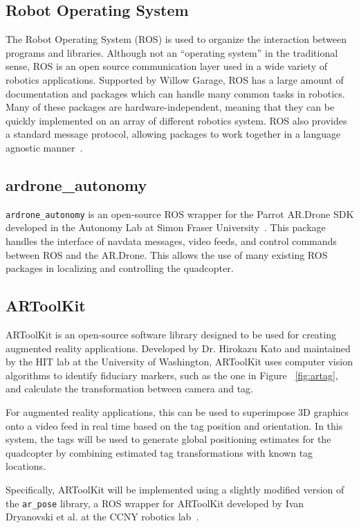     \subsection{Robot Operating System}
         The Robot Operating System (ROS) is used to organize the interaction between programs and libraries. Although not an ``operating system'' in the traditional sense, ROS is an open source communication layer used in a wide variety of robotics applications. Supported by Willow Garage, ROS has a large amount of documentation and packages which can handle many common tasks in robotics. Many of these packages are hardware-independent, meaning that they can be quickly implemented on an array of different robotics system. ROS also provides a standard message protocol, allowing packages to work together in a language agnostic manner~\cite{ROS}.

    \subsection{ardrone\_autonomy}
        \texttt{ardrone\_autonomy} is an open-source ROS wrapper for the Parrot AR.Drone SDK developed in the Autonomy Lab at Simon Fraser University~\cite{Autonomy}. This package handles the interface of navdata messages, video feeds, and control commands between ROS and the AR.Drone. This allows the use of many existing ROS packages in localizing and controlling the quadcopter.

    \subsection{ARToolKit}
        ARToolKit is an open-source software library designed to be used for creating augmented reality applications. Developed by Dr. Hirokazu Kato and maintained by the HIT lab at the University of Washington, ARToolKit uses computer vision algorithms to identify fiduciary markers, such as the one in Figure ~\ref{fig:artag}, and calculate the transformation between camera and tag. 

        For augmented reality applications, this can be used to superimpose 3D graphics onto a video feed in real time based on the tag position and orientation. In this system, the tags will be used to generate global positioning estimates for the quadcopter by combining estimated tag transformations with known tag locations.

        Specifically, ARToolKit will be implemented using a slightly modified version of the \texttt{ar\_pose} library, a ROS wrapper for ARToolKit developed by Ivan Dryanovski et al. at the CCNY robotics lab~\cite{arpose}.

